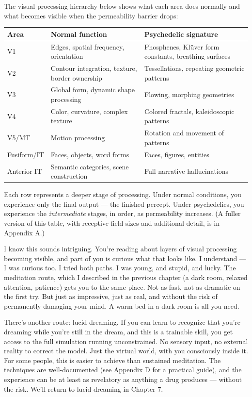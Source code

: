 \documentclass[11pt, twoside, openright]{book}
\begin{document}
The visual processing hierarchy below shows what each area does normally and what becomes visible when the permeability barrier drops:


{\small
\noindent
\begin{tabularx}{\linewidth}{X X X}
\toprule
\textbf{Area} & \textbf{Normal function} & \textbf{Psychedelic signature} \\
\midrule
V1 & Edges, spatial frequency, orientation & Phosphenes, Klüver form constants, breathing surfaces \\[4pt]
V2 & Contour integration, texture, border ownership & Tessellations, repeating geometric patterns \\[4pt]
V3 & Global form, dynamic shape processing & Flowing, morphing geometries \\[4pt]
V4 & Color, curvature, complex texture & Colored fractals, kaleidoscopic patterns \\[4pt]
V5/MT & Motion processing & Rotation and movement of patterns \\[4pt]
Fusiform/IT & Faces, objects, word forms & Faces, figures, entities \\[4pt]
Anterior IT & Semantic categories, scene construction & Full narrative hallucinations \\[4pt]
\bottomrule
\end{tabularx}
}


Each row represents a deeper stage of processing. Under normal conditions, you experience only the final output --- the finished percept. Under psychedelics, you experience the \textit{intermediate} stages, in order, as permeability increases. (A fuller version of this table, with receptive field sizes and additional detail, is in Appendix A.)

I know this sounds intriguing. You're reading about layers of visual processing becoming visible, and part of you is curious what that looks like. I understand --- I was curious too. I tried both paths. I was young, and stupid, and lucky. The meditation route, which I described in the previous chapter (a dark room, relaxed attention, patience) gets you to the same place. Not as fast, not as dramatic on the first try. But just as impressive, just as real, and without the risk of permanently damaging your mind. A warm bed in a dark room is all you need.

There's another route: lucid dreaming. If you can learn to recognize that you're dreaming while you're still in the dream, and this is a trainable skill, you get access to the full simulation running unconstrained. No sensory input, no external reality to correct the model. Just the virtual world, with you consciously inside it. For some people, this is easier to achieve than sustained meditation. The techniques are well-documented (see Appendix D for a practical guide), and the experience can be at least as revelatory as anything a drug produces --- without the risk. We'll return to lucid dreaming in Chapter 7.
\end{document}
